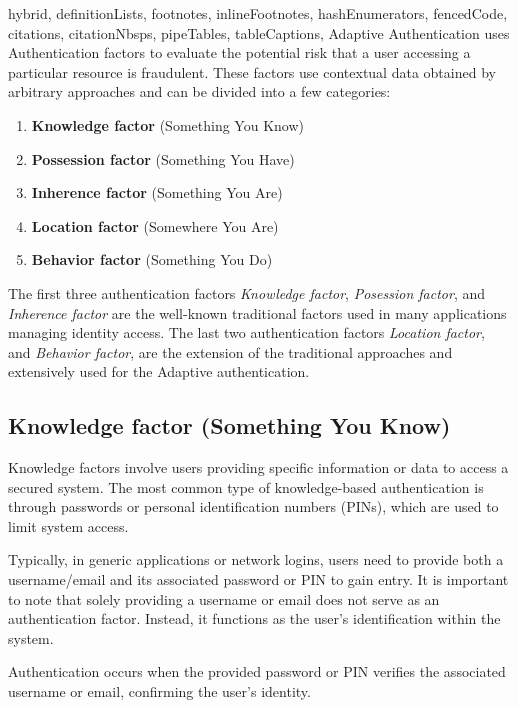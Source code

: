 \documentclass[
  digital,     %
  oneside,     %
  nosansbold,  %
  nocolorbold, %
  lof,         %
  lot,         %
]{fithesis4}
\begin{document}
\begin{markdown*}{%
  hybrid,
  definitionLists,
  footnotes,
  inlineFootnotes,
  hashEnumerators,
  fencedCode,
  citations,
  citationNbsps,
  pipeTables,
  tableCaptions,
}
Adaptive Authentication uses Authentication factors to evaluate the potential risk that a user accessing a particular resource is fraudulent.
\newline
\newline
These factors use contextual data obtained by arbitrary approaches and can be divided into a few categories:

\begin{enumerate}
    \item \textbf{Knowledge factor} (Something You Know)
    \item \textbf{Possession factor}  (Something You Have)
    \item \textbf{Inherence factor} (Something You Are)
    \item \textbf{Location factor} (Somewhere You Are)
    \item \textbf{Behavior factor} (Something You Do)
\end{enumerate}

The first three authentication factors \textit{Knowledge factor}, \textit{Posession factor}, and \textit{Inherence factor} are the well-known traditional factors used in many applications managing identity access.
The last two authentication factors \textit{Location factor}, and \textit{Behavior factor}, are the extension of the traditional approaches and extensively used for the Adaptive authentication.\cite{auth-factors-descope}  

\newpage
\subsection{Knowledge factor (Something You Know)}
Knowledge factors involve users providing specific information or data to access a secured system.
The most common type of knowledge-based authentication is through passwords or personal identification numbers (PINs), which are used to limit system access.

Typically, in generic applications or network logins, users need to provide both a username/email and its associated password or PIN to gain entry. It is important to note that solely providing a username or email does not serve as an authentication factor.
Instead, it functions as the user's identification within the system.

Authentication occurs when the provided password or PIN verifies the associated username or email, confirming the user's identity.


\end{markdown*}
\end{document}
